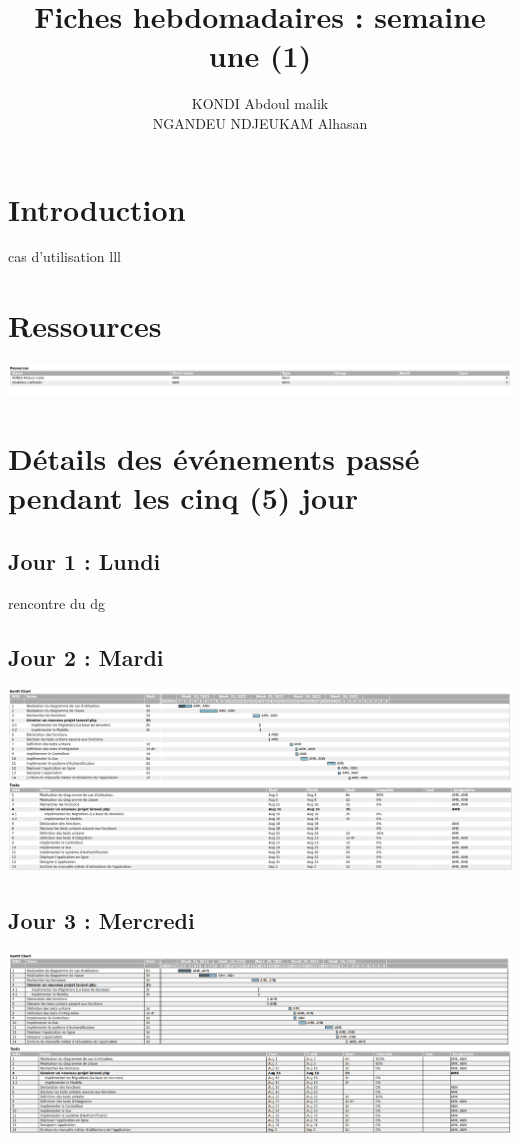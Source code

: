 \documentclass[12pt,a4paper]{article}
\author{KONDI Abdoul malik \\ NGANDEU NDJEUKAM Alhasan}
\title{Fiches hebdomadaires : semaine une (1)}
\begin{document}
\maketitle
\tableofcontents
\newpage

\section{Introduction}
	cas d'utilisation
	lll
\section{Ressources}
\includegraphics[scale=0.25]{images/resources.png}
\section{Détails des événements passé pendant les cinq (5) jour}
\subsection{Jour 1 : Lundi}
rencontre du dg 
\subsection{Jour 2 : Mardi}
\includegraphics[scale=0.23]{images/jour2.png}
\subsection{Jour 3 : Mercredi}
\includegraphics[scale=0.23]{images/jour3.png}
\end{document}
